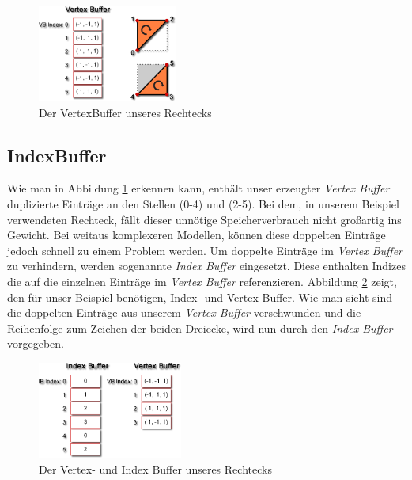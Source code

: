 \begin{Spacing}{\mylinespace}
\begin{figure}[h!]
	\vspace*{15px}
	\centering
	\includegraphics[height=120px]{graphics/vertexbuffer2.png}	
	\caption{Der VertexBuffer unseres Rechtecks}
	\label{fig:VertexBuffer}
\end{figure}

\subsection{IndexBuffer}
Wie man in Abbildung \ref{fig:VertexBuffer} erkennen kann, enthält unser erzeugter \textit{Vertex Buffer} duplizierte Einträge an den Stellen (0-4) und (2-5). Bei dem, in unserem Beispiel verwendeten Rechteck, fällt dieser unnötige Speicherverbrauch nicht großartig ins Gewicht. Bei weitaus komplexeren Modellen, können diese doppelten Einträge jedoch schnell zu einem Problem werden. Um doppelte Einträge im \textit{Vertex Buffer} zu verhindern, werden sogenannte \textit{Index Buffer} eingesetzt. Diese enthalten Indizes die auf die einzelnen Einträge im \textit{Vertex Buffer} referenzieren. Abbildung \ref{fig:IndexBuffer} zeigt, den für unser Beispiel benötigen, Index- und Vertex Buffer. Wie man sieht sind die doppelten Einträge aus unserem \textit{Vertex Buffer} verschwunden und die Reihenfolge zum Zeichen der beiden Dreiecke, wird nun durch den \textit{Index Buffer} vorgegeben. 
 

\begin{figure}[h!]
	\vspace*{15px}
	\centering
	\includegraphics[height=120px]{graphics/indexbuffer2.png}	
	\caption{Der Vertex- und Index Buffer unseres Rechtecks}
	\label{fig:IndexBuffer}
\end{figure}


\end{Spacing}

